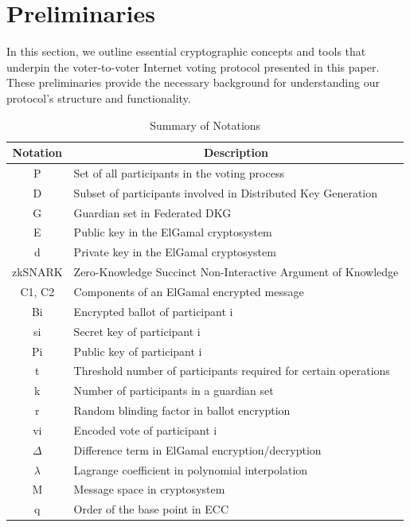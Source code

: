 \documentclass[runningheads]{llncs}
\begin{document}
\newcommand{\G}{\ensuremath{G}}


\newcommand{\SharePartialDecryptionFromTo}[2]{\ensuremath{[\mathrm{PD}_{#1}]_{#2}}}

\newcommand{\PartialDecryptionFrom}[1]{\ensuremath{\mathrm{PD}_{#1}}}

\section{Preliminaries}
In this section, we outline essential cryptographic concepts and tools that underpin the voter-to-voter Internet voting protocol presented in this paper. These preliminaries provide the necessary background for understanding our protocol's structure and functionality.

\begin{table}[h]
\centering
\caption{Summary of Notations}
\label{tab:notations}
\begin{tabular}{|c|l|}
\hline
\textbf{Notation} & \multicolumn{1}{c|}{\textbf{Description}} \\ \hline
P                 & Set of all participants in the voting process \\ \hline
D                 & Subset of participants involved in Distributed Key Generation \\ \hline
G                 & Guardian set in Federated DKG \\ \hline
E                 & Public key in the ElGamal cryptosystem \\ \hline
d                 & Private key in the ElGamal cryptosystem \\ \hline
zkSNARK           & Zero-Knowledge Succinct Non-Interactive Argument of Knowledge \\ \hline
C1, C2            & Components of an ElGamal encrypted message \\ \hline
Bi                & Encrypted ballot of participant i \\ \hline
si                & Secret key of participant i \\ \hline
Pi                & Public key of participant i \\ \hline
t                 & Threshold number of participants required for certain operations \\ \hline
k                 & Number of participants in a guardian set \\ \hline
r                 & Random blinding factor in ballot encryption \\ \hline
vi                & Encoded vote of participant i \\ \hline
$\Delta$          & Difference term in ElGamal encryption/decryption \\ \hline
$\lambda$         & Lagrange coefficient in polynomial interpolation \\ \hline
M                 & Message space in cryptosystem \\ \hline
q                 & Order of the base point in ECC \\ \hline
\end{tabular}
\end{table}
\end{document}
